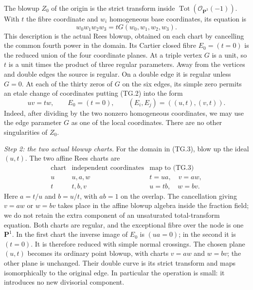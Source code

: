The blowup $Z_0$ of the origin is the strict transform inside
$\operatorname{Tot}(\mathcal O_{\mathbf P^3}(-1))$.  With $t$ the fibre
coordinate and $w_i$ homogeneous base coordinates, its equation is
\begin{equation}
 w_0w_1w_2w_3=tG(w_0,w_1,w_2,w_3).
 \tag{TG.2}
\end{equation}
This description is the actual Rees blowup, obtained on each chart by
cancelling the common fourth power in the domain.  Its Cartier closed
fibre $E_0=(t=0)$ is the reduced union of the four coordinate planes.
At a triple vertex $G$ is a unit, so $t$ is a unit times the product of
three regular parameters.  Away from the vertices and double edges
the source is regular.  On a double edge it is regular unless $G=0$.
At each of the thirty zeros of $G$ on the six edges, its simple zero
permits an etale change of coordinates putting (TG.2) into the form
\begin{equation}
 uv=tw,\qquad E_0=(t=0),\qquad
 (E_i,E_j)=((u,t),(v,t)).
 \tag{TG.3}
\end{equation}
Indeed, after dividing by the two nonzero homogeneous coordinates,
we may use the edge parameter $G$ as one of the local coordinates.
There are no other singularities of $Z_0$.

\emph{Step 2: the two actual blowup charts.}
For the domain in (TG.3), blow up the ideal $(u,t)$.
The two affine Rees charts are
\begin{equation}
 \begin{array}{c|c|c}
 \text{chart}&\text{independent coordinates}&\text{map to (TG.3)}\\ \hline
 u&u,a,w&t=ua,\quad v=aw,\\
 t&t,b,v&u=tb,\quad w=bv.
 \end{array}
 \tag{TG.4}
\end{equation}
Here $a=t/u$ and $b=u/t$, with $ab=1$ on the overlap.
The cancellation giving $v=aw$ or $w=bv$ takes place in the affine
blowup algebra inside the fraction field; we do not retain the extra
component of an unsaturated total-transform equation.
Both charts are regular, and the exceptional fibre over the node is
one $\mathbf P^1$.  In the first chart the inverse image of $E_0$ is
$(ua=0)$; in the second it is $(t=0)$.  It is therefore reduced with
simple normal crossings.  The chosen plane $(u,t)$ becomes its
ordinary point blowup, with charts $v=aw$ and $w=bv$; the other plane
is unchanged.  Their double curve is its strict transform and maps
isomorphically to the original edge.  In particular the operation is
small: it introduces no new divisorial component.

